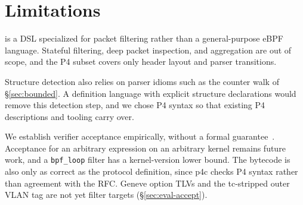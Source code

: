 \section{Limitations}
\label{sec:limitations}

\kunai is a DSL specialized for packet filtering rather than a
general-purpose eBPF language. Stateful filtering, deep packet
inspection, and aggregation are out of scope, and the P4 subset
covers only header layout and parser transitions.

Structure detection
also relies on parser idioms such as the counter walk of
\S\ref{sec:bounded}. A definition language with explicit structure
declarations would remove this detection step, and we chose P4 syntax
so that existing P4 descriptions and tooling carry over.

We establish verifier acceptance empirically, without a formal
guarantee~\cite{vishwanathan2022tristate}. Acceptance for an arbitrary
expression on an arbitrary kernel remains future work, and a
\texttt{bpf\_loop} filter has a kernel-version lower bound. The
bytecode is also only as correct as the protocol definition, since p4c
checks P4 syntax rather than agreement with the RFC. Geneve option
TLVs and the tc-stripped outer VLAN tag are not yet filter targets
(\S\ref{sec:eval-accept}).